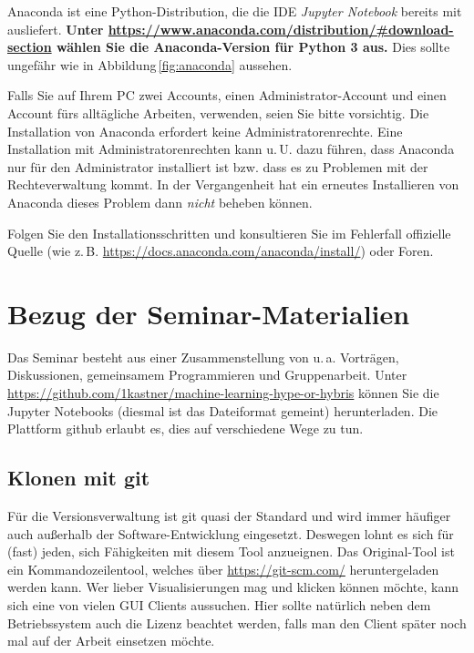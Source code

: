 \documentclass{tufte-handout}
\begin{document}
Anaconda ist eine Python-Distribution, die die IDE \emph{Jupyter Notebook} bereits mit ausliefert.
{
  \bfseries
  Unter \url{https://www.anaconda.com/distribution/#download-section} wählen Sie die Anaconda-Version für Python 3 aus.
}
Dies sollte ungefähr wie in Abbildung\,\ref{fig:anaconda} aussehen.

Falls Sie auf Ihrem PC zwei Accounts, einen Administrator-Account und einen Account fürs alltägliche Arbeiten, verwenden, seien Sie bitte vorsichtig.
Die Installation von Anaconda erfordert keine Administratorenrechte.
Eine Installation mit Administratorenrechten kann u.\,U. dazu führen, dass Anaconda nur für den Administrator installiert ist bzw. dass es zu Problemen mit der Rechteverwaltung kommt.
In der Vergangenheit hat ein erneutes Installieren von Anaconda dieses Problem dann \emph{nicht} beheben können.

Folgen Sie den Installationsschritten und konsultieren Sie im Fehlerfall offizielle Quelle (wie z.\,B. \url{https://docs.anaconda.com/anaconda/install/}) oder Foren.


\section{Bezug der Seminar-Materialien}

Das Seminar besteht aus einer Zusammenstellung von u.\,a. Vorträgen, Diskussionen, gemeinsamem Programmieren und Gruppenarbeit.
Unter \url{https://github.com/1kastner/machine-learning-hype-or-hybris} können Sie die Jupyter Notebooks (diesmal ist das Dateiformat gemeint) herunterladen.
Die Plattform github erlaubt es, dies auf verschiedene Wege zu tun.

\subsection{Klonen mit git}

Für die Versionsverwaltung ist git quasi der Standard und wird immer häufiger auch außerhalb der Software-Entwicklung eingesetzt.
Deswegen lohnt es sich für (fast) jeden, sich Fähigkeiten mit diesem Tool anzueignen.
Das Original-Tool ist ein Kommandozeilentool, welches über \url{https://git-scm.com/} heruntergeladen werden kann.
Wer lieber Visualisierungen mag und klicken können möchte, kann sich eine von vielen GUI Clients%
aussuchen.
Hier sollte natürlich neben dem Betriebssystem auch die Lizenz beachtet werden, falls man den Client später noch mal auf der Arbeit einsetzen möchte.
\end{document}
